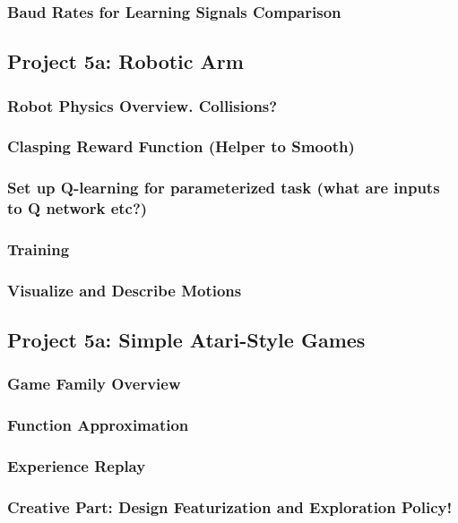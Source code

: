 \documentclass[12pt]{article}
\begin{document}
      \subsubsection*{Baud Rates for Learning Signals Comparison}
    \newpage

    \subsection*{Project 5a: Robotic Arm}
      \subsubsection*{Robot Physics Overview.  Collisions?}
      \subsubsection*{Clasping Reward Function (Helper to Smooth)}
      \subsubsection*{Set up Q-learning for parameterized task (what are inputs to Q network etc?)} %
      \subsubsection*{Training}
      \subsubsection*{Visualize and Describe Motions}
    \newpage

    \subsection*{Project 5a: Simple Atari-Style Games} %
      \subsubsection*{Game Family Overview}
      \subsubsection*{Function Approximation}
      \subsubsection*{Experience Replay}
      \subsubsection*{Creative Part: Design Featurization and Exploration Policy!}
\end{document}
